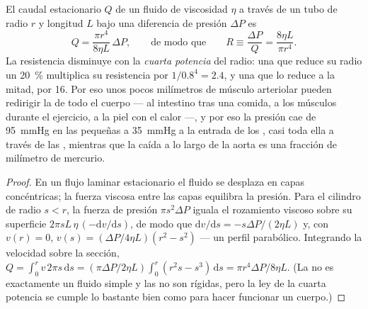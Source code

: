 \begin{theorem}\label{thm:b2:blood-circulation:poiseuille}
El caudal estacionario $Q$ de un fluido de viscosidad $\eta$ a través de
un tubo de radio $r$ y longitud $L$ bajo una diferencia de presión
$\Delta P$ es
\[
Q = \frac{\pi r^{4}}{8\eta L}\,\Delta P, \qquad \text{de modo que}\qquad
R \equiv \frac{\Delta P}{Q} = \frac{8\eta L}{\pi r^{4}} .
\]
La resistencia disminuye con la \emph{cuarta potencia} del radio: una
 que reduce su radio un \qty{20}{\%} multiplica su resistencia
por $1/0.8^{4} = 2.4$, y una que lo reduce a la mitad, por 16. Por eso
unos pocos milímetros de músculo arteriolar pueden redirigir la  de
todo el cuerpo --- al intestino tras una comida, a los músculos durante el
ejercicio, a la piel con el calor ---, y por eso la presión cae de
\qty{95}{mmHg} en las pequeñas  a \qty{35}{mmHg} a la entrada de
los , casi toda ella a través de las , mientras que la
caída a lo largo de la aorta es una fracción de milímetro de mercurio.
\end{theorem}
\begin{proof}
En un flujo laminar estacionario el fluido se desplaza en capas
concéntricas; la fuerza viscosa entre las capas equilibra la presión. Para
el cilindro de radio $s < r$, la fuerza de presión $\pi s^{2}\Delta P$
iguala el rozamiento viscoso sobre su superficie $2\pi s L\,\eta\,(-\mathrm{d}v/
\mathrm{d}s)$, de modo que $\mathrm{d}v/\mathrm{d}s = -s\Delta P/(2\eta L)$
y, con $v(r) = 0$, $v(s) = (\Delta P/4\eta L)(r^{2} - s^{2})$ --- un perfil
parabólico. Integrando la velocidad sobre la sección,
$Q = \int_{0}^{r} v\,2\pi s\,\mathrm{d}s = (\pi\Delta P/2\eta L)
\int_{0}^{r}(r^{2}s - s^{3})\,\mathrm{d}s = \pi r^{4}\Delta P/8\eta
L$. (La  no es exactamente un fluido simple y las  no son
rígidas, pero la ley de la cuarta potencia se cumple lo bastante bien como
para hacer funcionar un cuerpo.)
\end{proof}


